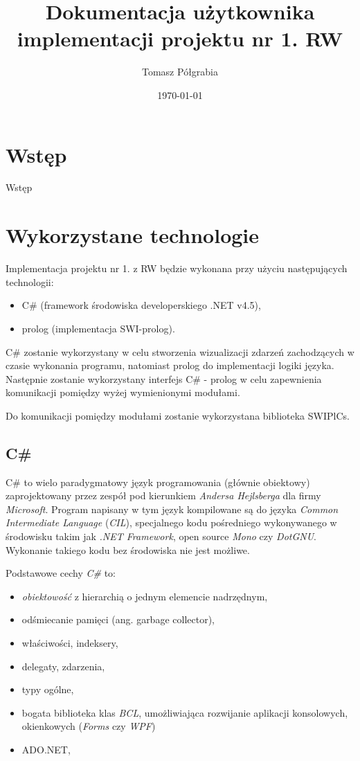 \documentclass[a4paper]{article}
\title{Dokumentacja użytkownika implementacji projektu nr 1. RW}
\author{Tomasz Półgrabia}
\date{\today}
\begin{document}
\maketitle

\begin{abstract}

\end{abstract}

\section{Wstęp}
	Wstęp

\section{Wykorzystane technologie}
	Implementacja projektu nr 1. z RW będzie wykonana przy użyciu następujących technologii:
    \begin{itemize}
    	\item C\# (framework środowiska developerskiego .NET v4.5),
        \item prolog (implementacja SWI-prolog).
    \end{itemize}
    
    C\# zostanie wykorzystany w celu stworzenia wizualizacji zdarzeń zachodzących w czasie wykonania
    programu, natomiast prolog do implementacji logiki języka. Następnie zostanie wykorzystany
    interfejs C\# - prolog w celu zapewnienia komunikacji pomiędzy wyżej wymienionymi modułami.
    
    Do komunikacji pomiędzy modułami zostanie wykorzystana biblioteka SWIPlCs.
    
    \subsection{C\#}
    C\# to wielo paradygmatowy język programowania (głównie obiektowy)
    zaprojektowany przez zespół pod kierunkiem \textit{Andersa Hejlsberga}
    dla firmy \textit{Microsoft}. Program napisany w tym język kompilowane są
    do języka \textit{Common Intermediate Language} (\textit{CIL}),
    specjalnego kodu pośredniego wykonywanego w środowisku takim jak 
    \textit{.NET Framework}, open source \textit{Mono} czy \textit{DotGNU}.
    Wykonanie takiego kodu bez środowiska nie jest możliwe.

    Podstawowe cechy \textit{C\#} to:
    \begin{itemize}
        \item \textit{obiektowość} z hierarchią o jednym elemencie nadrzędnym,
        \item odśmiecanie pamięci (ang. garbage collector),
        \item właściwości, indeksery,
        \item delegaty, zdarzenia,
        \item typy ogólne,
        \item bogata biblioteka klas \textit{BCL}, umożliwiająca rozwijanie
            aplikacji konsolowych, okienkowych (\textit{Forms} czy \textit{WPF})
        \item ADO.NET,
    \end{itemize}
\end{document}
